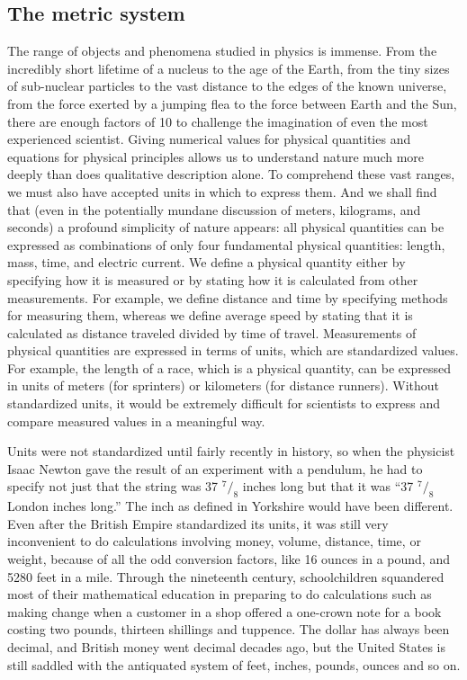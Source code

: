 \subsection{The metric system}
The range of objects and phenomena studied in physics is immense. From the incredibly short lifetime of a nucleus to the age of the Earth, from the tiny sizes of sub-nuclear particles to the vast distance to the edges of the known universe, from the force exerted by a jumping flea to the force between Earth and the Sun, there are enough factors of 10 to challenge the imagination of even the most experienced scientist. Giving numerical values for physical quantities and equations for physical principles allows us to understand nature much more deeply than does qualitative description alone. To comprehend these vast ranges, we must also have accepted units in which to express them. And we shall find that (even in the potentially mundane discussion of meters, kilograms, and seconds) a profound simplicity of nature appears: all physical quantities can be expressed as combinations of only four fundamental physical quantities: length, mass, time, and electric current. We define a physical quantity either by specifying how it is measured or by stating how it is calculated from other measurements. For example, we define distance and time by specifying methods for measuring them, whereas we define average speed by stating that it is calculated as distance traveled divided by time of travel.
Measurements of physical quantities are expressed in terms of units, which are standardized values. For example, the length of a race, which is a physical quantity, can be expressed in units of meters (for sprinters) or kilometers (for distance runners). Without standardized units, it would be
extremely difficult for scientists to express and compare measured values in a meaningful way.

Units were not standardized until fairly recently in
history, so when the physicist Isaac
Newton gave the result of an experiment with a pendulum, he
had to specify not just that the string was 37  $^7/_8$
inches long but that it was ``37  $^7/_8$ London inches
long.'' The inch as defined in Yorkshire would have been
different. Even after the British Empire standardized its
units, it was still very inconvenient to do calculations
involving money, volume, distance, time, or weight, because
of all the odd conversion factors, like 16 ounces in a
pound, and 5280 feet in a mile. Through the nineteenth
century, schoolchildren squandered most of their mathematical
education in preparing to do calculations such as making
change when a customer in a shop offered a one-crown note
for a book costing two pounds, thirteen shillings and
tuppence. The dollar has always been decimal, and British
money went decimal decades ago, but the United States is
still saddled with the antiquated system of feet, inches,
pounds, ounces and so on.


